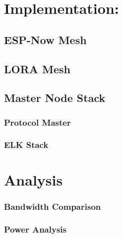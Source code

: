 \section*{Implementation:}\label{sec:implementation}

\subsection{ESP-Now Mesh}\label{sec:espnowmesh}

\subsection{LORA Mesh}\label{sec:loramesh}

\subsection{Master Node Stack}\label{sec:master}

\subsubsection{Protocol Master}\label{sec:protocol}

\subsubsection{ELK Stack}\label{sec:elk}



\section*{Analysis}\label{sec:analysis}

\subsubsection{Bandwidth Comparison}\label{sec:bandwidth_comparison}

\subsubsection{Power Analysis}\label{sec:power_analysis}
